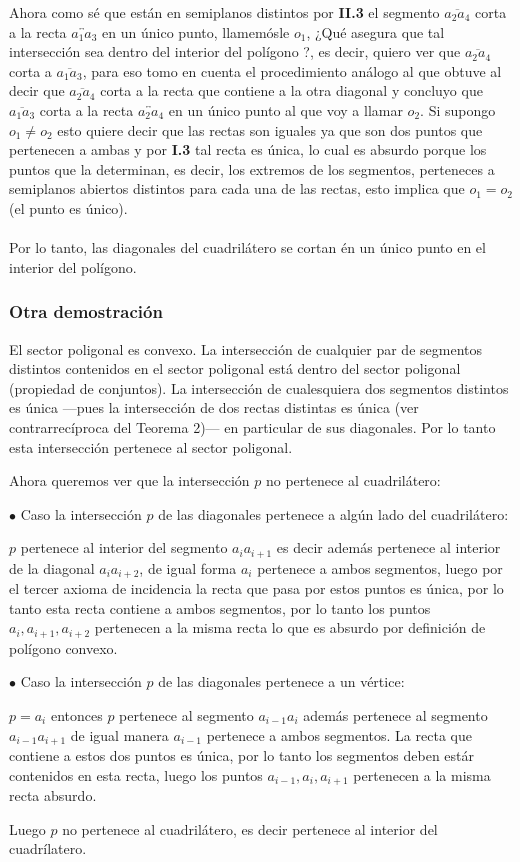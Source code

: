 \documentclass[a4paper]{article}
\begin{document}
Ahora como sé que están en semiplanos distintos por \textbf{II.3} el segmento $\overline{a_2a_4}$ corta a la recta $\overleftrightarrow{a_1a_3}$ en un único punto, llamemósle $o_1$, ¿Qué asegura que tal intersección sea dentro del interior del polígono ?, es decir, quiero ver que $\overline{a_2a_4}$ corta a $\overline{a_1a_3}$, para eso tomo en cuenta el procedimiento análogo al que obtuve al decir que $\overline{a_2a_4}$ corta a la recta que contiene a la otra diagonal y concluyo que $\overline{a_1a_3}$ corta a la recta $\overleftrightarrow{a_2a_4}$ en un único punto al que voy a llamar $o_2$. Si supongo $o_1 \neq o_2$ esto quiere decir que las rectas son iguales ya que son dos puntos que pertenecen a ambas y por \textbf{I.3} tal recta es única, lo cual es absurdo porque los puntos que la determinan, es decir, los extremos de los segmentos, perteneces a semiplanos abiertos distintos para cada una de las rectas, esto implica que $o_1=o_2$ (el punto es único).\\\\
Por lo tanto, las diagonales del cuadrilátero se cortan én un único punto en el interior del polígono.

\subsubsection{Otra demostración}
El sector poligonal es convexo. La intersección de cualquier par de segmentos distintos contenidos en el sector poligonal está dentro del sector poligonal (propiedad de conjuntos). La intersección de cualesquiera dos segmentos distintos es única —pues la intersección de dos rectas distintas es única (ver contrarrecíproca del Teorema 2)— en particular de sus diagonales. Por lo tanto esta intersección pertenece al sector poligonal.

Ahora queremos ver que la intersección $p$ no pertenece al cuadrilátero:

$\bullet$ Caso la intersección $p$ de las diagonales pertenece a algún lado del cuadrilátero:  

$p$ pertenece al interior del segmento $a_{i}a_{i+1}$ es decir además pertenece
al interior de la diagonal $a_{i}a_{i+2}$, de igual forma $a_{i}$ pertenece a
ambos segmentos, luego por el tercer axioma de incidencia la recta que pasa por
estos puntos es única, por lo tanto esta recta contiene a ambos segmentos,
por lo tanto los puntos $a_{i},a_{i+1},a_{i+2}$ pertenecen a la
misma recta lo que es absurdo por definición de polígono convexo.

$\bullet$ Caso la intersección $p$ de las diagonales pertenece a un vértice:

$p=a_{i}$ entonces $p$ pertenece al segmento $a_{i-1}a_{i}$ además pertenece
al segmento $a_{i-1}a_{i+1}$ de igual manera $a_{i-1}$ pertenece a ambos segmentos.
La recta que contiene a estos dos puntos es única, por lo tanto
los segmentos deben estár contenidos en esta recta, luego los puntos
$a_{i-1}, a_{i}, a_{i+1}$ pertenecen a la misma recta absurdo.

Luego $p$ no pertenece al cuadrilátero, es decir pertenece al interior del cuadrílatero.
\end{document}
